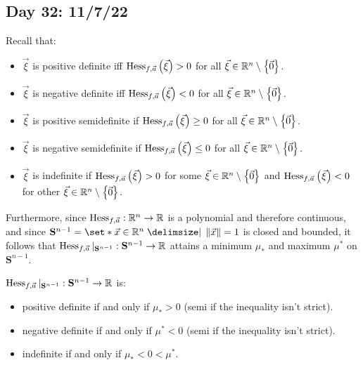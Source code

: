 \documentclass[main.tex]{subfiles}
\begin{document}
\subsection{Day 32: 11/7/22}

Recall that:
\begin{itemize}
    \item $\vec\xi$ is positive definite iff $\operatorname{Hess}_{f, \vec{a}}\left( \vec\xi \right) > 0$ for all $\vec\xi\in \mathbb R^n\setminus\left\{ \vec{0} \right\}$.
    \item $\vec\xi$ is negative definite iff $\operatorname{Hess}_{f, \vec{a}}\left( \vec\xi \right) < 0$ for all $\vec\xi\in \mathbb R^n\setminus\left\{ \vec{0} \right\}$.
    \item $\vec\xi$ is positive semidefinite if $\operatorname{Hess}_{f, \vec{a}}\left( \vec\xi \right) \ge 0$ for all $\vec\xi\in \mathbb R^n\setminus\left\{ \vec{0} \right\}$.
    \item $\vec\xi$ is negative semidefinite if $\operatorname{Hess}_{f, \vec{a}}\left( \vec\xi \right) \le 0$ for all $\vec\xi\in \mathbb R^n\setminus\left\{ \vec{0} \right\}$.
    \item $\vec\xi$ is indefinite if $\operatorname{Hess}_{f, \vec{a}}\left( \vec\xi \right) > 0$ for some $\vec\xi\in \mathbb R^n\setminus\left\{ \vec{0} \right\}$ and $\operatorname{Hess}_{f, \vec{a}}\left( \vec\xi \right) < 0$ for other $\vec\xi\in \mathbb R^n\setminus\left\{ \vec{0} \right\}$.
\end{itemize}

Furthermore, since $\operatorname{Hess}_{f, \vec{a}} : \mathbb R^n\to \mathbb R$ is a polynomial and therefore continuous, and since $\mathbf{S}^{n - 1} = \set*{\vx \in \RR^n \mid \norm\vx = 1}$ is closed and bounded, it follows that $\operatorname{Hess}_{f, \vec{a}} |_{\mathbf{S}^{n - 1}} : \mathbf{S}^{n - 1} \to \mathbb R$ attains a minimum $\mu_*$ and maximum $\mu^*$ on $\mathbf{S}^{n - 1}$.

\begin{proposition}
    $\operatorname{Hess}_{f, \vec{a}} |_{\mathbf{S}^{n - 1}} : \mathbf{S}^{n - 1} \to \mathbb R$ is:
    \begin{itemize}
        \item positive definite if and only if $\mu_* > 0$ (semi if the inequality isn't strict).
        \item negative definite if and only if $\mu^* < 0$ (semi if the inequality isn't strict).
        \item indefinite if and only if $\mu_* < 0 < \mu^*$.
    \end{itemize}
\end{proposition}
\end{document}
